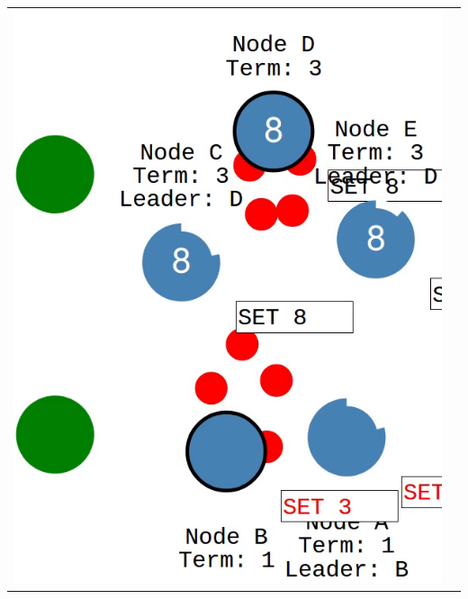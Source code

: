 \begin{tabularx}{\textwidth}{ |X|X| }
  \includegraphics[scale=0.28]{scenarios/network_partition/2163.png} &

\end{tabularx}
